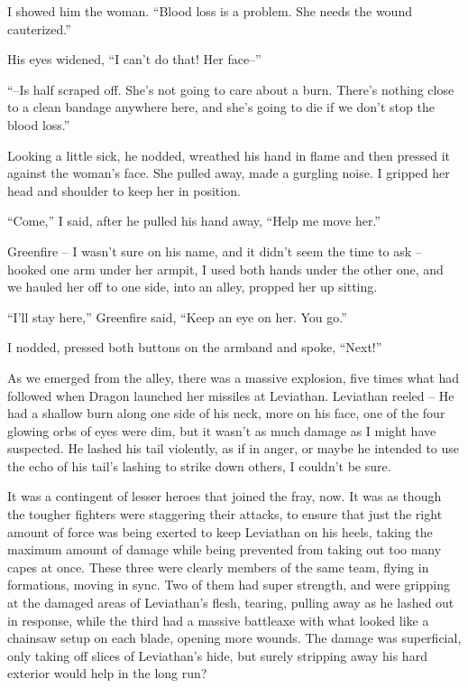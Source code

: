 I showed him the woman.  ``Blood loss is a problem.  She needs the wound cauterized.''



His eyes widened, ``I can't do that!  Her face--''



``--Is half scraped off.  She's not going to care about a burn.  There's nothing close to a clean bandage anywhere here, and she's going to die if we don't stop the blood loss.''



Looking a little sick, he nodded, wreathed his hand in flame and then pressed it against the woman's face.  She pulled away, made a gurgling noise.  I gripped her head and shoulder to keep her in position.



``Come,'' I said, after he pulled his hand away, ``Help me move her.''



Greenfire – I wasn't sure on his name, and it didn't seem the time to ask – hooked one arm under her armpit, I used both hands under the other one, and we hauled her off to one side, into an alley, propped her up sitting.



``I'll stay here,'' Greenfire said, ``Keep an eye on her.  You go.''



I nodded, pressed both buttons on the armband and spoke, ``Next!''



As we emerged from the alley, there was a massive explosion, five times what had followed when Dragon launched her missiles at Leviathan.  Leviathan reeled – He had a shallow burn along one side of his neck, more on his face, one of the four glowing orbs of eyes were dim, but it wasn't as much damage as I might have suspected.  He lashed his tail violently, as if in anger, or maybe he intended to use the echo of his tail's lashing to strike down others, I couldn't be sure.



It was a contingent of lesser heroes that joined the fray, now.  It was as though the tougher fighters were staggering their attacks, to ensure that just the right amount of force was being exerted to keep Leviathan on his heels, taking the maximum amount of damage while being prevented from taking out too many capes at once.  These three were clearly members of the same team, flying in formations, moving in sync.  Two of them had super strength, and were gripping at the damaged areas of Leviathan's flesh, tearing, pulling away as he lashed out in response, while the third had a massive battleaxe with what looked like a chainsaw setup on each blade, opening more wounds.  The damage was superficial, only taking off slices of Leviathan's hide, but surely stripping away his hard exterior would help in the long run?



